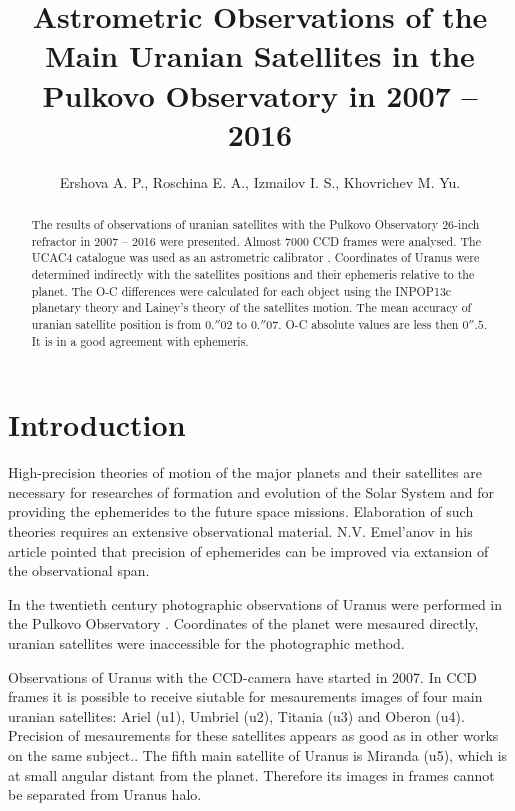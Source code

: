 \documentclass[]{article}
\title{Astrometric Observations of the Main Uranian Satellites in the Pulkovo Observatory in 2007 -- 2016}
\author{Ershova A. P., Roschina E. A., Izmailov I. S., Khovrichev M. Yu.}
\begin{document}
\maketitle

\begin{abstract}
The results of observations of uranian satellites with the Pulkovo Observatory 26-inch refractor in 2007 -- 2016 were presented. Almost 7000 CCD frames were analysed. The UCAC4 catalogue was used as an astrometric calibrator . Coordinates of Uranus were determined indirectly with the satellites positions and their ephemeris relative to the planet. The O-C differences were calculated for each object using the INPOP13c planetary theory and Lainey's theory of the satellites motion. The mean accuracy of uranian satellite position is from $0.''02$ to $0.''07$. O-C absolute values are less then $0''.5$. It is in a good agreement with ephemeris.
\end{abstract}

\section{Introduction}
High-precision theories of motion of the major planets and their satellites  are necessary for researches of formation and evolution of the Solar System and for providing the ephemerides to the future space missions. Elaboration of such theories requires an extensive observational material. N.V. Emel'anov in his article \cite{4} pointed that precision of ephemerides can be improved via extansion of the observational span.\par

In the twentieth century photographic observations of Uranus were performed in the Pulkovo Observatory \cite{8}. Coordinates of the planet were mesaured directly, uranian satellites were inaccessible for the photographic method.\par

Observations of Uranus with the CCD-camera have started in 2007. In CCD frames it is possible to receive siutable for mesaurements images of four main uranian satellites: Ariel (u1), Umbriel (u2), Titania (u3) and Oberon (u4). Precision of mesaurements for these satellites appears as good as in other works on the same subject.\cite{2, 7}. The fifth main satellite of Uranus is Miranda (u5), which is at small angular distant from the planet. Therefore its images in frames cannot be separated from Uranus halo.\par
\end{document}
